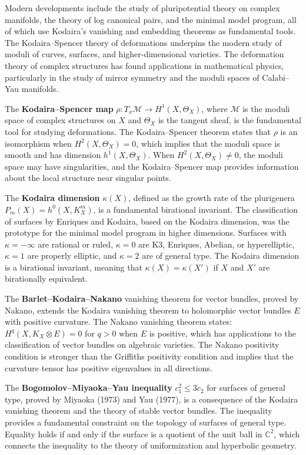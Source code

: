 Modern developments include the study of pluripotential theory on
complex manifolds, the theory of log canonical pairs, and the minimal
model program, all of which use Kodaira's vanishing and embedding
theorems as fundamental tools. The Kodaira--Spencer theory of
deformations underpins the modern study of moduli of curves, surfaces,
and higher-dimensional varieties. The deformation theory of complex
structures has found applications in mathematical physics, particularly
in the study of mirror symmetry and the moduli spaces of Calabi--Yau
manifolds.

The \textbf{Kodaira--Spencer map} $\rho: T_x \mathcal{M} \to H^1(X,
\Theta_X)$, where $\mathcal{M}$ is the moduli space of complex
structures on $X$ and $\Theta_X$ is the tangent sheaf, is the
fundamental tool for studying deformations. The Kodaira--Spencer
theorem states that $\rho$ is an isomorphism when $H^2(X, \Theta_X) =
0$, which implies that the moduli space is smooth and has dimension
$h^1(X, \Theta_X)$. When $H^2(X, \Theta_X) \neq 0$, the moduli space
may have singularities, and the Kodaira--Spencer map provides
information about the local structure near singular points.

The \textbf{Kodaira dimension} $\kappa(X)$, defined as the growth rate
of the plurigenera $P_m(X) = h^0(X, K_X^m)$, is a fundamental
birational invariant. The classification of surfaces by Enriques and
Kodaira, based on the Kodaira dimension, was the prototype for the
minimal model program in higher dimensions. Surfaces with $\kappa =
-\infty$ are rational or ruled, $\kappa = 0$ are K3, Enriques, Abelian,
or hyperelliptic, $\kappa = 1$ are properly elliptic, and $\kappa = 2$
are of general type. The Kodaira dimension is a birational invariant,
meaning that $\kappa(X) = \kappa(X')$ if $X$ and $X'$ are birationally
equivalent.

The \textbf{Barlet--Kodaira--Nakano} vanishing theorem for vector
bundles, proved by Nakano, extends the Kodaira vanishing theorem to
holomorphic vector bundles $E$ with positive curvature. The Nakano
vanishing theorem states: $H^q(X, K_X \otimes E) = 0$ for $q > 0$
when $E$ is positive, which has applications to the classification of
vector bundles on algebraic varieties. The Nakano positivity condition
is stronger than the Griffiths positivity condition and implies that
the curvature tensor has positive eigenvalues in all directions.

The \textbf{Bogomolov--Miyaoka--Yau inequality} $c_1^2 \leq 3c_2$ for
surfaces of general type, proved by Miyaoka (1973) and Yau (1977), is
a consequence of the Kodaira vanishing theorem and the theory of stable
vector bundles. The inequality provides a fundamental constraint on the
topology of surfaces of general type. Equality holds if and only if the
surface is a quotient of the unit ball in $\mathbb{C}^2$, which
connects the inequality to the theory of uniformization and hyperbolic
geometry.

